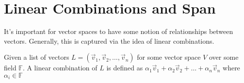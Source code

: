\section{Linear Combinations and Span}
It's important for vector spaces to have some notion of relationships between vectors. Generally, this is captured via the idea of linear combinations.
\begin{definition}
    Given a list of vectors $L=(\vec{v}_1,\vec{v}_2,\ldots,\vec{v}_n)$ for some vector space $V$ over some field $\mathbb{F}$. A linear combination of $L$ is defined as $\alpha_1\vec{v}_1+\alpha_2\vec{v}_2+\ldots+\alpha_n\vec{v}_n$ where $\alpha_i\in\mathbb{F}$
\end{definition}
